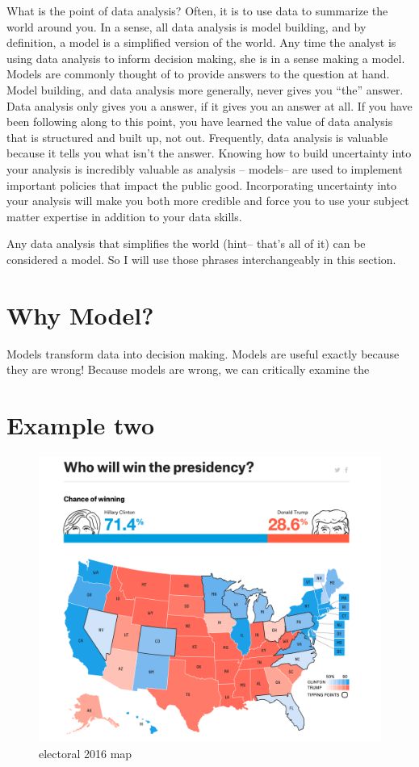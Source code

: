 \documentclass[]{book}
\begin{document}
What is the point of data analysis? Often, it is to use data to summarize the world around you. In a sense, all data analysis is model building, and by definition, a model is a simplified version of the world. Any time the analyst is using data analysis to inform decision making, she is in a sense making a model. Models are commonly thought of to provide answers to the question at hand. Model building, and data analysis more generally, never gives you ``the'' answer. Data analysis only gives you a answer, if it gives you an answer at all. If you have been following along to this point, you have learned the value of data analysis that is structured and built up, not out. Frequently, data analysis is valuable because it tells you what isn't the answer. Knowing how to build uncertainty into your analysis is incredibly valuable as analysis -- models-- are used to implement important policies that impact the public good. Incorporating uncertainty into your analysis will make you both more credible and force you to use your subject matter expertise in addition to your data skills.

Any data analysis that simplifies the world (hint-- that's all of it) can be considered a model. So I will use those phrases interchangeably in this section.

\hypertarget{why-model}{%
\section{Why Model?}\label{why-model}}

Models transform data into decision making. Models are useful exactly because they are wrong! Because models are wrong, we can critically examine the

\hypertarget{example-two}{%
\section{Example two}\label{example-two}}

\begin{figure}
\centering
\includegraphics{images/map.png}
\caption{electoral 2016 map}
\end{figure}
\end{document}

